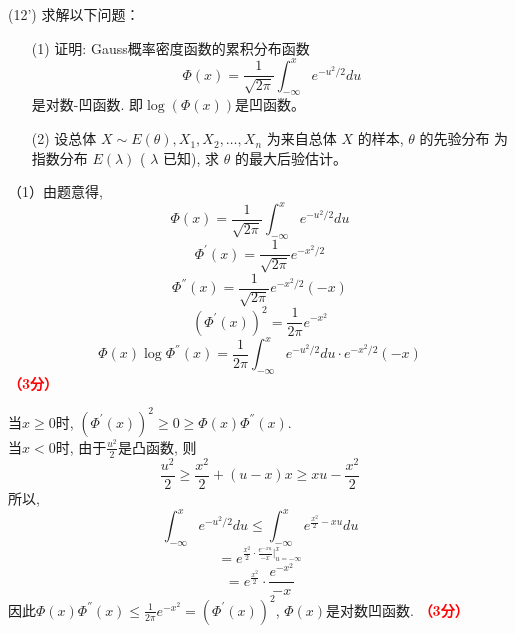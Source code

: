 \documentclass[12pt,a4paper,openany,twoside]{ctexbook}
\begin{document}
\begin{exercise}(12')
	求解以下问题：
\begin{itemize}
	\item [(1)] 证明: Gauss概率密度函数的累积分布函数
	\begin{displaymath}
		\Phi(x)=\frac{1}{\sqrt{2\pi}}\int^{x}_{-\infty}e^{-u^{2}/2}du
	\end{displaymath}
	是对数-凹函数. 即$ \log(\Phi(x)) $是凹函数。
	\item [(2)] 设总体 $X \sim E(\theta), X_{1}, X_{2}, \ldots, X_{n}$ 为来自总体 $X$ 的样本, $\theta$ 的先验分布
	为指数分布 $E(\lambda)$ ( $\lambda$ 已知), 求 $\theta$ 的最大后验估计。
\end{itemize}

\end{exercise}
\begin{Solution}
	（1）由题意得,
	$$\Phi(x)=\frac{1}{\sqrt{2\pi}}\int^{x}_{-\infty}e^{-u^{2}/2}du $$
	$$\Phi^{'}(x)=\frac{1}{\sqrt{2\pi}}e^{-x^{2}/2}$$
	$$\Phi^{''}(x)=\frac{1}{\sqrt{2\pi}}e^{-x^{2}/2}(-x)$$
	$$(\Phi^{'}(x))^{2}=\frac{1}{2\pi}e^{-x^{2}}$$
	$$\Phi(x)\log\Phi^{''}(x) = \frac{1}{2\pi}\int^{x}_{-\infty}e^{-u^{2}/2}du \cdot e^{-x^{2}/2}(-x)$$
	\hfill \textcolor{red}{\textbf{（3分）}}
	
	当$x\geq 0$时, $(\Phi^{'}(x))^{2} \geq 0 \geq \Phi(x)\Phi^{''}(x)$. \\
	当$x < 0$时, 由于$\frac{u^{2}}{2}$是凸函数, 则
	$$\frac{u^{2}}{2} \geq \frac{x^{2}}{2} + (u-x)x\geq xu - \frac{x^{2}}{2}$$
	所以,
	$$\int^{x}_{-\infty}e^{-u^{2}/2}du \leq  \int^{x}_{-\infty}e^{\frac{x^{2}}{2}- xu}du$$
	$$=  e^{\frac{x^{2}}{2}\cdot\frac{e^{-xu}}{-x}\big|_{u=-\infty}^{x}}$$
	$$=  e^{\frac{x^{2}}{2}}\cdot\frac{e^{-x^{2}}}{-x}$$
	因此$\Phi(x)\Phi^{''}(x) \leq \frac{1}{2\pi}e^{-x^{2}} = (\Phi^{'}(x))^{2}$, $\Phi(x)$是对数凹函数.
	\hfill \textcolor{red}{\textbf{（3分）}}
	

\end{Solution}
\end{document}
